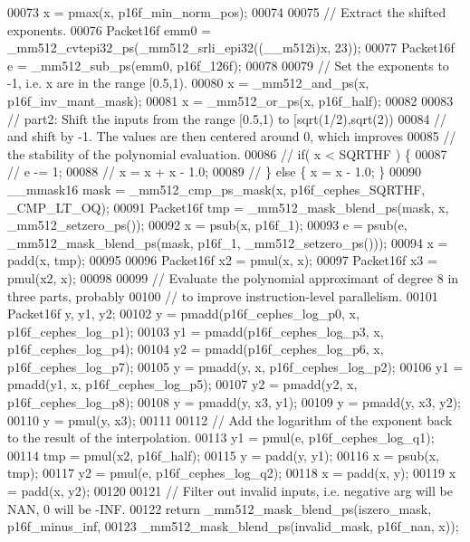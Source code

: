 \begin{DoxyCode}
00073   x = pmax(x, p16f\_min\_norm\_pos);
00074 
00075   \textcolor{comment}{// Extract the shifted exponents.}
00076   Packet16f emm0 = \_mm512\_cvtepi32\_ps(\_mm512\_srli\_epi32((\_\_m512i)x, 23));
00077   Packet16f e = \_mm512\_sub\_ps(emm0, p16f\_126f);
00078 
00079   \textcolor{comment}{// Set the exponents to -1, i.e. x are in the range [0.5,1).}
00080   x = \_mm512\_and\_ps(x, p16f\_inv\_mant\_mask);
00081   x = \_mm512\_or\_ps(x, p16f\_half);
00082 
00083   \textcolor{comment}{// part2: Shift the inputs from the range [0.5,1) to [sqrt(1/2),sqrt(2))}
00084   \textcolor{comment}{// and shift by -1. The values are then centered around 0, which improves}
00085   \textcolor{comment}{// the stability of the polynomial evaluation.}
00086   \textcolor{comment}{//   if( x < SQRTHF ) \{}
00087   \textcolor{comment}{//     e -= 1;}
00088   \textcolor{comment}{//     x = x + x - 1.0;}
00089   \textcolor{comment}{//   \} else \{ x = x - 1.0; \}}
00090   \_\_mmask16 mask = \_mm512\_cmp\_ps\_mask(x, p16f\_cephes\_SQRTHF, \_CMP\_LT\_OQ);
00091   Packet16f tmp = \_mm512\_mask\_blend\_ps(mask, x, \_mm512\_setzero\_ps());
00092   x = psub(x, p16f\_1);
00093   e = psub(e, \_mm512\_mask\_blend\_ps(mask, p16f\_1, \_mm512\_setzero\_ps()));
00094   x = padd(x, tmp);
00095 
00096   Packet16f x2 = pmul(x, x);
00097   Packet16f x3 = pmul(x2, x);
00098 
00099   \textcolor{comment}{// Evaluate the polynomial approximant of degree 8 in three parts, probably}
00100   \textcolor{comment}{// to improve instruction-level parallelism.}
00101   Packet16f y, y1, y2;
00102   y = pmadd(p16f\_cephes\_log\_p0, x, p16f\_cephes\_log\_p1);
00103   y1 = pmadd(p16f\_cephes\_log\_p3, x, p16f\_cephes\_log\_p4);
00104   y2 = pmadd(p16f\_cephes\_log\_p6, x, p16f\_cephes\_log\_p7);
00105   y = pmadd(y, x, p16f\_cephes\_log\_p2);
00106   y1 = pmadd(y1, x, p16f\_cephes\_log\_p5);
00107   y2 = pmadd(y2, x, p16f\_cephes\_log\_p8);
00108   y = pmadd(y, x3, y1);
00109   y = pmadd(y, x3, y2);
00110   y = pmul(y, x3);
00111 
00112   \textcolor{comment}{// Add the logarithm of the exponent back to the result of the interpolation.}
00113   y1 = pmul(e, p16f\_cephes\_log\_q1);
00114   tmp = pmul(x2, p16f\_half);
00115   y = padd(y, y1);
00116   x = psub(x, tmp);
00117   y2 = pmul(e, p16f\_cephes\_log\_q2);
00118   x = padd(x, y);
00119   x = padd(x, y2);
00120 
00121   \textcolor{comment}{// Filter out invalid inputs, i.e. negative arg will be NAN, 0 will be -INF.}
00122   \textcolor{keywordflow}{return} \_mm512\_mask\_blend\_ps(iszero\_mask, p16f\_minus\_inf,
00123                               \_mm512\_mask\_blend\_ps(invalid\_mask, p16f\_nan, x));

\end{DoxyCode}
